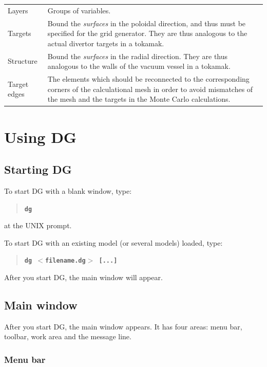 \documentclass[12pt]{report}
\begin{document}
\begin{supertabular}{lp{300pt}}
Layers
 &  
Groups of variables.
 \\
 
Targets
 &  
Bound the \textit{surfaces} in the poloidal direction, and thus must be
specified for the grid generator.  They are thus analogous to the 
actual divertor targets in a tokamak.
 \\
Structure
& 
Bound the \textit{surfaces} in the radial direction.  They are thus
analogous to the walls of the vacuum vessel in a tokamak.
\\
Target edges
&
The elements which should be reconnected to the corresponding corners
of the calculational mesh in order to avoid mismatches of the mesh and
the targets in the Monte Carlo calculations. \\
\end{supertabular}
\vspace{2pt}


\chapter{Using DG}

\section{Starting DG}

To start DG with a blank window, type:
\begin{quote}
\textbf{\texttt{dg}}
\end{quote}
at the UNIX prompt.

To start DG with an existing model (or several models) loaded, type:
\begin{quote}
\textbf{\texttt{dg
\begin{math}< \end{math}filename.dg\begin{math}> \end{math} [...]}}
\end{quote}
After you start DG, the main window will appear.

\section{Main window}

After you start DG, the main window appears. It has four areas: menu
bar, toolbar, work area and the message line.

\subsection{Menu bar}
\end{document}
